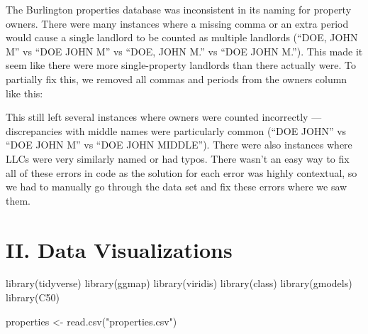 \documentclass[
]{article}
\newenvironment{Shaded}{\begin{snugshade}}{\end{snugshade}}
\newcommand{\FunctionTok}[1]{\textcolor[rgb]{0.00,0.00,0.00}{#1}}
\newcommand{\NormalTok}[1]{#1}
\newcommand{\OtherTok}[1]{\textcolor[rgb]{0.56,0.35,0.01}{#1}}
\newcommand{\SpecialCharTok}[1]{\textcolor[rgb]{0.00,0.00,0.00}{#1}}
\newcommand{\StringTok}[1]{\textcolor[rgb]{0.31,0.60,0.02}{#1}}
\begin{document}
The Burlington properties database was inconsistent in its naming for
property owners. There were many instances where a missing comma or an
extra period would cause a single landlord to be counted as multiple
landlords (``DOE, JOHN M'' vs ``DOE JOHN M'' vs ``DOE, JOHN M.'' vs
``DOE JOHN M.''). This made it seem like there were more single-property
landlords than there actually were. To partially fix this, we removed
all commas and periods from the owners column like this:

\begin{Shaded}
\end{Shaded}

This still left several instances where owners were counted incorrectly
--- discrepancies with middle names were particularly common (``DOE
JOHN'' vs ``DOE JOHN M'' vs ``DOE JOHN MIDDLE''). There were also
instances where LLCs were very similarly named or had typos. There
wasn't an easy way to fix all of these errors in code as the solution
for each error was highly contextual, so we had to manually go through
the data set and fix these errors where we saw them.

\hypertarget{ii.-data-visualizations}{%
\section{II. Data Visualizations}\label{ii.-data-visualizations}}

\begin{Shaded}
\begin{Highlighting}[]
\FunctionTok{library}\NormalTok{(tidyverse)}
\FunctionTok{library}\NormalTok{(ggmap)}
\FunctionTok{library}\NormalTok{(viridis)}
\FunctionTok{library}\NormalTok{(class)}
\FunctionTok{library}\NormalTok{(gmodels)}
\FunctionTok{library}\NormalTok{(C50)}

\NormalTok{properties }\OtherTok{\textless{}{-}} \FunctionTok{read.csv}\NormalTok{(}\StringTok{"properties.csv"}\NormalTok{)}
\end{Highlighting}
\end{Shaded}
\end{document}

